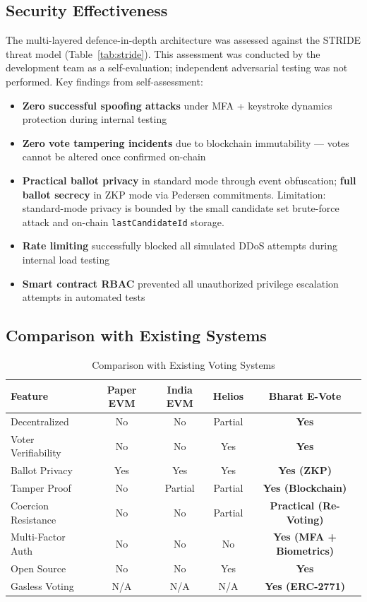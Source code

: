 \documentclass[oneside,a4paper,12pt]{book}
\begin{document}
\subsection{Security Effectiveness}
The multi-layered defence-in-depth architecture was assessed against the STRIDE threat model (Table~\ref{tab:stride}). This assessment was conducted by the development team as a self-evaluation; independent adversarial testing was not performed. Key findings from self-assessment:
\begin{itemize}[leftmargin=1.5cm]
    \item \textbf{Zero successful spoofing attacks} under MFA + keystroke dynamics protection during internal testing
    \item \textbf{Zero vote tampering incidents} due to blockchain immutability --- votes cannot be altered once confirmed on-chain
    \item \textbf{Practical ballot privacy} in standard mode through event obfuscation; \textbf{full ballot secrecy} in ZKP mode via Pedersen commitments. Limitation: standard-mode privacy is bounded by the small candidate set brute-force attack and on-chain \texttt{lastCandidateId} storage.
    \item \textbf{Rate limiting} successfully blocked all simulated DDoS attempts during internal load testing
    \item \textbf{Smart contract RBAC} prevented all unauthorized privilege escalation attempts in automated tests
\end{itemize}

\subsection{Comparison with Existing Systems}
\begin{table}[htbp]
\centering
\renewcommand{\arraystretch}{1.3}
\small
\begin{tabularx}{\textwidth}{|X|c|c|c|c|}
\hline
\textbf{Feature} & \textbf{Paper EVM} & \textbf{India EVM \cite{eci2024}} & \textbf{Helios \cite{adida2008}} & \textbf{Bharat E-Vote} \\
\hline
Decentralized & No & No & Partial & \textbf{Yes} \\
\hline
Voter Verifiability & No & No & Yes & \textbf{Yes} \\
\hline
Ballot Privacy & Yes & Yes & Yes & \textbf{Yes (ZKP)} \\
\hline
Tamper Proof & No & Partial & Partial & \textbf{Yes (Blockchain)} \\
\hline
Coercion Resistance & No & No & Partial & \textbf{Practical (Re-Voting)} \\
\hline
Multi-Factor Auth & No & No & No & \textbf{Yes (MFA + Biometrics)} \\
\hline
Open Source & No & No & Yes & \textbf{Yes} \\
\hline
Gasless Voting & N/A & N/A & N/A & \textbf{Yes (ERC-2771)} \\
\hline
\end{tabularx}
\caption{Comparison with Existing Voting Systems}
\label{tab:comparison}
\end{table}
\end{document}
